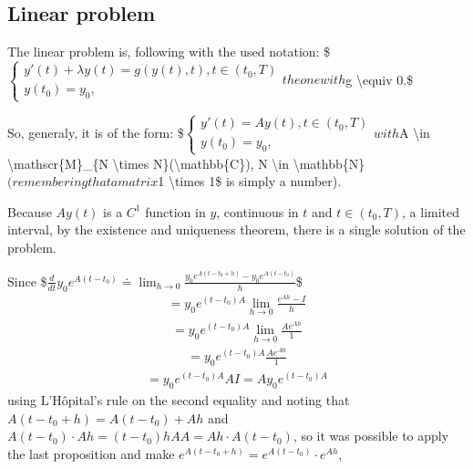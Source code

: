\documentclass[letterpaper,10pt,english]{jupyterBook}
\begin{document}
\subsection{Linear problem}
\label{\detokenize{cap3:linear-problem}}
\sphinxAtStartPar
The linear problem is, following with the used notation:
\$\(
\begin{cases}
    y'(t) + \lambda y(t) = g(y(t), t), t \in (t_0, T) \\
    y(t_0) = y_0 
    \text{,}
\end{cases}
\)\(
the one with \)g \textbackslash{}equiv 0.\$

\sphinxAtStartPar
So, generaly, it is of the form:
\$\(
\begin{cases}
    y'(t) = A y(t), t \in (t_0, T) \\
    y(t_0) = y_0 
    \text{,}
\end{cases}
\)\(
with \)A \textbackslash{}in \textbackslash{}mathscr\{M\}\_\{N \textbackslash{}times N\}(\textbackslash{}mathbb\{C\}), N \textbackslash{}in \textbackslash{}mathbb\{N\}\(  (remembering that a matrix \)1 \textbackslash{}times 1\$ is simply a number).

\sphinxAtStartPar
Because \(A y(t)\) is a \(C^1\) function in \(y\), continuous in \(t\) and \(t \in (t_0, T)\), a limited interval, by the existence and uniqueness theorem, there is a single solution of the problem.

\sphinxAtStartPar
Since
\$\(
    \frac{d}{dt}y_0e^{A(t-t_0)} \doteq \lim_{h\to0} \frac{y_0e^{A(t-t_0+h)}-y_0e^{A(t-t_0)}}{h}
\)\$
\begin{equation*}
\begin{split}
    = y_0e^{(t-t_0)A}\lim_{h\to0} \frac{e^{Ah}-I}{h} 
\end{split}
\end{equation*}\begin{equation*}
\begin{split}
    = y_0e^{(t-t_0)A}\lim_{h\to0} \frac{Ae^{Ah}}{1} 
\end{split}
\end{equation*}\begin{equation*}
\begin{split}
    = y_0e^{(t-t_0)A} \frac{Ae^{A0}}{1}
\end{split}
\end{equation*}\begin{equation*}
\begin{split}
    = y_0e^{(t-t_0)A} A I = A y_0e^{(t-t_0)A} 
\end{split}
\end{equation*}
\sphinxAtStartPar
using L’Hôpital’s rule on the second equality and noting that \(A(t-t_0+h) = A(t-t_0)+Ah\) and \(A(t-t_0) \cdot Ah = (t-t_0)hAA = Ah \cdot A(t-t_0)\), so it was possible to apply the last proposition and make \(e^{A(t-t_0+h)} = e^{A(t-t_0)} \cdot e^{Ah}\),
\end{document}
